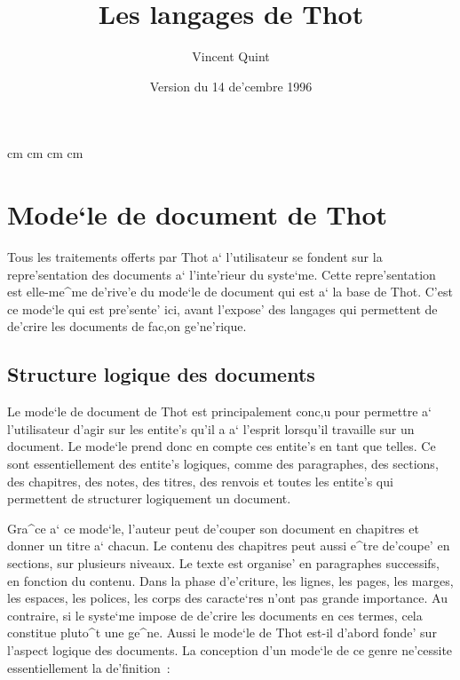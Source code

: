 
\marginparwidth 0pt
 cm
 cm
\marginparsep 0pt
\topmargin   0pt
 cm
 cm

\newenvironment{example}{\begin{quotation}\noindent{\bf Exemple~:}}{\end{quotation}}


\sloppy

\title{\Huge Les langages de Thot}
\author{Vincent Quint}
\date{Version du 14 de'cembre 1996}
\maketitle

\chapter{Mode`le de document de Thot}

Tous les traitements offerts par Thot a` l'utilisateur se fondent sur la
repre'sentation des documents a` l'inte'rieur du syste`me. Cette repre'sentation
est elle-me^me de'rive'e du mode`le de document qui est a` la base de Thot.
C'est ce mode`le qui est pre'sente' ici, avant l'expose' des langages qui
permettent de de'crire les documents de fac,on ge'ne'rique.

\section{Structure logique des documents}

Le mode`le de document de Thot est principalement conc,u pour permettre a`
l'utilisateur d'agir sur les entite's qu'il a a` l'esprit lorsqu'il travaille
sur un document. Le mode`le prend donc en compte ces entite's en tant que
telles. Ce sont essentiellement des entite's logiques, comme des paragraphes,
des sections, des chapitres, des notes, des titres, des renvois et toutes les
entite's qui permettent de structurer logiquement un document.

Gra^ce a` ce mode`le, l'auteur peut de'couper son document en chapitres et
donner un titre a` chacun. Le contenu des chapitres peut aussi e^tre de'coupe'
en sections, sur plusieurs niveaux. Le texte est organise' en paragraphes
successifs, en fonction du contenu. Dans la phase d'e'criture, les
lignes, les pages, les marges, les espaces, les polices, les corps des
caracte`res n'ont pas grande importance. Au contraire, si le syste`me impose
de de'crire les documents en ces termes, cela constitue pluto^t une ge^ne.
Aussi le mode`le de Thot est-il d'abord fonde' sur l'aspect logique des
documents. La conception d'un mode`le de ce genre ne'cessite essentiellement
la de'finition~:

